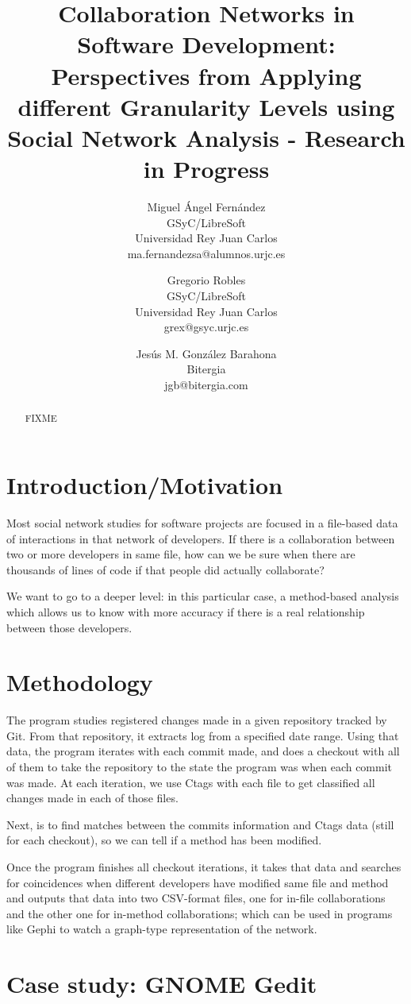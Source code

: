 \documentclass[a4paper]{article}
\title{Collaboration Networks in Software Development: Perspectives from Applying different Granularity Levels using Social Network Analysis - Research in Progress}
\author{
Miguel Ángel Fernández \\ GSyC/LibreSoft \\
                Universidad Rey Juan Carlos \\ ma.fernandezsa@alumnos.urjc.es
\and
Gregorio Robles \\ GSyC/LibreSoft \\
                Universidad Rey Juan Carlos \\ grex@gsyc.urjc.es
\and
Jesús M. González Barahona \\ Bitergia \\
                jgb@bitergia.com
}
\begin{document}
\maketitle

\begin{abstract}
FIXME
\end{abstract}
\vskip 32pt


\section{Introduction/Motivation}

Most social network studies for software projects are focused in a file-based
data of interactions in that network of developers. If there is a
collaboration between two or more developers in same file, how can we be sure
when there are thousands of lines of code if that people did actually
collaborate?

We want to go to a deeper level: in this particular case, a method-based
analysis which allows us to know with more accuracy if there is a real
relationship between those developers.

\section{Methodology}

The program studies registered changes made in a given repository tracked by
Git. From that repository, it extracts log from a specified date range. Using
that data, the program iterates with each commit made, and does a checkout
with all of them to take the repository to the state the program was when each
commit was made. At each iteration, we use Ctags with each file to get
classified all changes made in each of those files.

Next, is to find matches
between the commits information and Ctags data (still for each checkout), so
we can tell if a method has been modified.

Once the program finishes all checkout iterations, it takes that data and
searches for coincidences when different developers have modified same file
and method and outputs that data into two CSV-format files, one for in-file
collaborations and the other one for in-method collaborations; which can be
used in programs like Gephi to watch a graph-type representation of the
network.

\section{Case study: GNOME Gedit}
\end{document}
